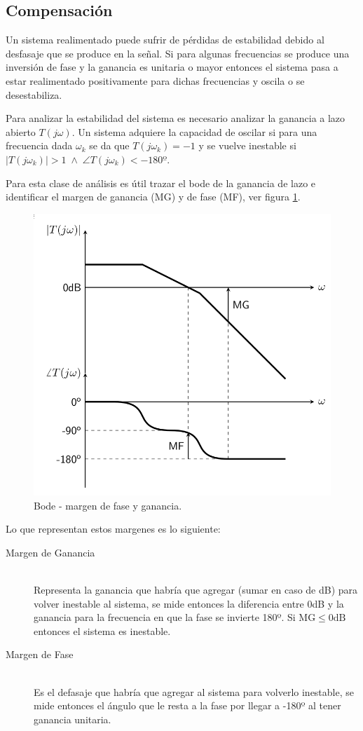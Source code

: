 \subsection{Compensación}

Un sistema realimentado puede sufrir de pérdidas de estabilidad debido al desfasaje que se produce en la señal. Si para algunas frecuencias se produce una inversión de fase y la ganancia es unitaria o mayor entonces el sistema pasa a estar realimentado positivamente para dichas frecuencias y oscila o se desestabiliza.

Para analizar la estabilidad del sistema es necesario analizar la ganancia a lazo abierto $T(j\omega)$. Un sistema adquiere la capacidad de oscilar si para una frecuencia dada $\omega_k$ se da que $T(j\omega_k)=-1$ y se vuelve inestable si $\left| T(j\omega_k) \right| > 1 \; \land \; \angle T(j\omega_k) < -180º$.

Para esta clase de análisis es útil trazar el bode de la ganancia de lazo e identificar el margen de ganancia (MG) y de fase (MF), ver figura \ref{fig:margenes}.


\begin{figure}[H]
	\centering
	\includegraphics[height=0.4\textwidth]{img/margenes}
	\caption{Bode - margen de fase y ganancia.}
	\label{fig:margenes}
\end{figure}


Lo que representan estos margenes es lo siguiente:


\begin{description}
	\item[Margen de Ganancia] \hfill \\
		Representa la ganancia que habría que agregar (sumar en caso de dB) para volver inestable al sistema, se mide entonces la diferencia entre 0dB y la ganancia para la frecuencia en que la fase se invierte 180º. Si $\mathrm{MG} \le \mathrm{0dB}$ entonces el sistema es inestable.

	\item[Margen de Fase] \hfill \\
		Es el defasaje que habría que agregar al sistema para volverlo inestable, se mide entonces el ángulo que le resta a la fase por llegar a -180º al tener ganancia unitaria.
\end{description}

